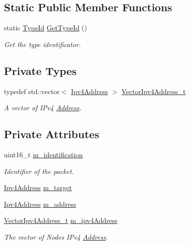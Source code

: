 \subsection*{Static Public Member Functions}
\begin{DoxyCompactItemize}
\item 
static \hyperlink{classns3_1_1TypeId}{Type\+Id} \hyperlink{classns3_1_1dsr_1_1DsrOptionRreqHeader_a0b2abe33e17f893637c0a11f9ace53d4}{Get\+Type\+Id} ()
\begin{DoxyCompactList}\small\item\em Get the type identificator. \end{DoxyCompactList}\end{DoxyCompactItemize}
\subsection*{Private Types}
\begin{DoxyCompactItemize}
\item 
typedef std\+::vector$<$ \hyperlink{classns3_1_1Ipv4Address}{Ipv4\+Address} $>$ \hyperlink{classns3_1_1dsr_1_1DsrOptionRreqHeader_a68bb878706d4d36a8d5a36c3f36cb239}{Vector\+Ipv4\+Address\+\_\+t}
\begin{DoxyCompactList}\small\item\em A vector of I\+Pv4 \hyperlink{classns3_1_1Address}{Address}. \end{DoxyCompactList}\end{DoxyCompactItemize}
\subsection*{Private Attributes}
\begin{DoxyCompactItemize}
\item 
uint16\+\_\+t \hyperlink{classns3_1_1dsr_1_1DsrOptionRreqHeader_a807a833e56f4730ce76b21843bde6858}{m\+\_\+identification}
\begin{DoxyCompactList}\small\item\em Identifier of the packet. \end{DoxyCompactList}\item 
\hyperlink{classns3_1_1Ipv4Address}{Ipv4\+Address} \hyperlink{classns3_1_1dsr_1_1DsrOptionRreqHeader_a19bba241260fbfda8df02ee3e74ff4ff}{m\+\_\+target}
\item 
\hyperlink{classns3_1_1Ipv4Address}{Ipv4\+Address} \hyperlink{classns3_1_1dsr_1_1DsrOptionRreqHeader_a274e289fe5886379d6a33bc5f28f683f}{m\+\_\+address}
\item 
\hyperlink{classns3_1_1dsr_1_1DsrOptionRreqHeader_a68bb878706d4d36a8d5a36c3f36cb239}{Vector\+Ipv4\+Address\+\_\+t} \hyperlink{classns3_1_1dsr_1_1DsrOptionRreqHeader_ac4457c65d46dc4a8fed812c387512d0c}{m\+\_\+ipv4\+Address}
\begin{DoxyCompactList}\small\item\em The vector of Nodes\textquotesingle{} I\+Pv4 \hyperlink{classns3_1_1Address}{Address}. \end{DoxyCompactList}\end{DoxyCompactItemize}
